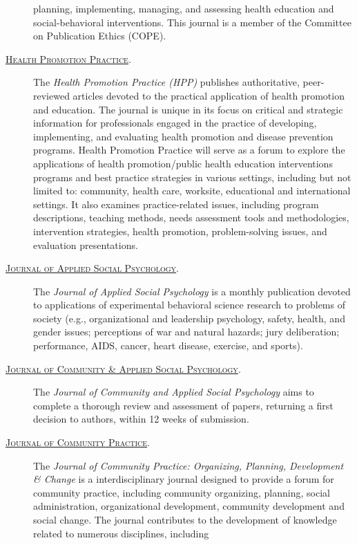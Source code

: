 \documentclass[]{tufte-handout}
\begin{document}
\begin{description}
planning, implementing, managing, and assessing health education and
social-behavioral interventions. This journal is a member of the
Committee on Publication Ethics (COPE).
\item[\href{http://hpp.sagepub.com/}{\textsc{Health Promotion Practice}}.]
The \emph{Health Promotion Practice (HPP)} publishes authoritative,
peer-reviewed articles devoted to the practical application of health
promotion and education. The journal is unique in its focus on critical
and strategic information for professionals engaged in the practice of
developing, implementing, and evaluating health promotion and disease
prevention programs. Health Promotion Practice will serve as a forum to
explore the applications of health promotion/public health education
interventions programs and best practice strategies in various settings,
including but not limited to: community, health care, worksite,
educational and international settings. It also examines
practice-related issues, including program descriptions, teaching
methods, needs assessment tools and methodologies, intervention
strategies, health promotion, problem-solving issues, and evaluation
presentations.
\item[\href{http://www.wiley.com/WileyCDA/WileyTitle/productCd-JASP.html}{\textsc{Journal of Applied Social Psychology}}.]
The \emph{Journal of Applied Social Psychology} is a monthly publication
devoted to applications of experimental behavioral science research to
problems of society (e.g., organizational and leadership psychology,
safety, health, and gender issues; perceptions of war and natural
hazards; jury deliberation; performance, AIDS, cancer, heart disease,
exercise, and sports).
\item[\href{http://www.wiley.com/WileyCDA/WileyTitle/productCd-CASP.html}{\textsc{Journal of Community \& Applied Social Psychology}}.]
The \emph{Journal of Community and Applied Social Psychology} aims to
complete a thorough review and assessment of papers, returning a first
decision to authors, within 12 weeks of submission.
\item[\href{https://www.acosa.org/joomla/journalinfo}{\textsc{Journal of Community Practice}}.]
The \emph{Journal of Community Practice: Organizing, Planning,
Development \& Change} is a interdisciplinary journal designed to
provide a forum for community practice, including community organizing,
planning, social administration, organizational development, community
development and social change. The journal contributes to the
development of knowledge related to numerous disciplines, including

\end{description}
\end{document}
